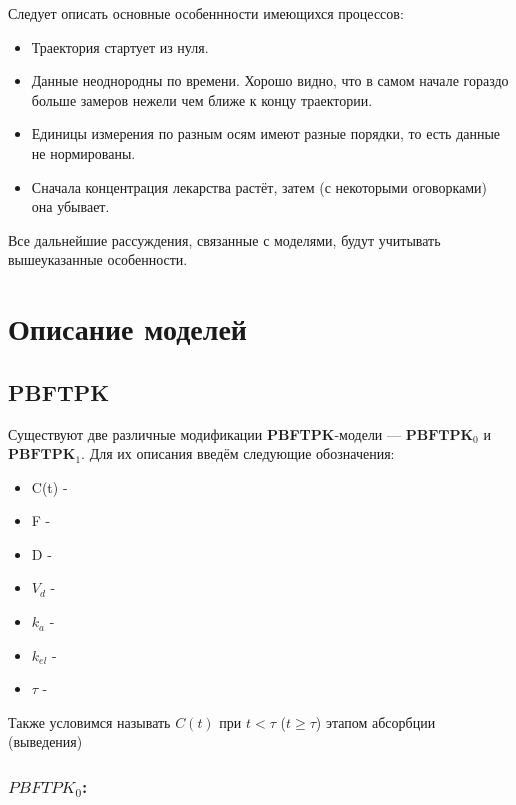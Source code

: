\documentclass[12pt]{article}
\begin{document}
Следует описать основные особеннности имеющихся процессов:

\begin{itemize}
	\item Траектория стартует из нуля.
	\item Данные неоднородны по времени. Хорошо видно, что в самом начале гораздо больше замеров нежели чем ближе к концу траектории.
	\item Единицы измерения по разным осям имеют разные порядки, то есть данные не нормированы.
	\item Сначала концентрация лекарства растёт, затем (с некоторыми оговорками) она убывает.
\end{itemize}

Все дальнейшие рассуждения, связанные с моделями, будут учитывать вышеуказанные особенности.


\newpage

\section{Описание моделей}

\subsection{PBFTPK}

Существуют две различные модификации \textbf{PBFTPK}-модели --- $\textbf{PBFTPK}_0$ и $\textbf{PBFTPK}_1$. Для их описания введём следующие обозначения:

\begin{itemize}
	\item C(t) - 
	\item F - 
	\item D - 
	\item $V_d$ - 
	\item $k_a$ - 
	\item $k_{el}$ - 
	\item $\tau$ - 
\end{itemize}

Также условимся называть $C(t)$ при $t < \tau$ ($t \ge \tau$) этапом абсорбции (выведения)

\subsubsection*{$PBFTPK_0$:}
\end{document}
